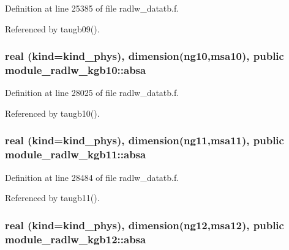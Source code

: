 Definition at line 25385 of file radlw\+\_\+datatb.\+f.



Referenced by taugb09().

\subsubsection[{\texorpdfstring{absa}{absa}}]{\setlength{\rightskip}{0pt plus 5cm}real (kind=kind\+\_\+phys), dimension(ng10,msa10), public module\+\_\+radlw\+\_\+kgb10\+::absa}\hypertarget{group__module__radlw__main_ga14f18538f77c1a3d651e36acf90baa19}{}\label{group__module__radlw__main_ga14f18538f77c1a3d651e36acf90baa19}


Definition at line 28025 of file radlw\+\_\+datatb.\+f.



Referenced by taugb10().

\subsubsection[{\texorpdfstring{absa}{absa}}]{\setlength{\rightskip}{0pt plus 5cm}real (kind=kind\+\_\+phys), dimension(ng11,msa11), public module\+\_\+radlw\+\_\+kgb11\+::absa}\hypertarget{group__module__radlw__main_ga7ac883387aa86a635c9aea011c55a1d5}{}\label{group__module__radlw__main_ga7ac883387aa86a635c9aea011c55a1d5}


Definition at line 28484 of file radlw\+\_\+datatb.\+f.



Referenced by taugb11().

\subsubsection[{\texorpdfstring{absa}{absa}}]{\setlength{\rightskip}{0pt plus 5cm}real (kind=kind\+\_\+phys), dimension(ng12,msa12), public module\+\_\+radlw\+\_\+kgb12\+::absa}\hypertarget{group__module__radlw__main_ga7600bfa19dde3b47d8479f5766ee0c93}{}\label{group__module__radlw__main_ga7600bfa19dde3b47d8479f5766ee0c93}


